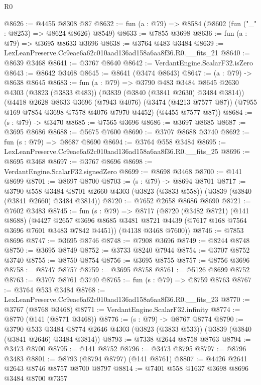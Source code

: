 \begin{lexlean}{R0}
\begin{coremodule}
@8626 := @4455 @8308 @87
@8632 := fun (a : @79) => @8584 (@8602 (fun ("_" : @8253) => @8624 @8626) @8549)
@8633 := @7855 @3698
@8636 := fun (a : @79) => @3695 @8633 @3696
@8638 := @3764 @483 @3484
@8639 := LexLeanPreserve.Cc9eae6a62c010aad136ad158a6aa8f36.R0.__fits_21
@8640 := @8639 @3468
@8641 := @3767 @8640
@8642 := VerdantEngine.ScalarF32.isZero
@8643 := @8642 @3468
@8645 := @8641 (@3474 @8643)
@8647 := (a : @79) -> @8638 @8645
@8683 := fun (a : @79) =>
  @3790
    @483
    @3484
    @8645
    @2630
    @4303
    (@3823 (@3833 @483))
    (@3839 (@3840 (@3841 @2630) @3484 @3814))
    (@4418
      @2628
      @8633
      @3696
      (@7943 @4076)
      (@3474 (@4213 @7577 @87))
      (@7955 @169 @7854 @3698 @7578 @4076 @7970 @4452)
      (@4455 @7577 @87))
@8684 := (s : @79) -> @3470
@8685 := @7565 @3696
@8686 := @3697 @8685
@8687 := @3695 @8686
@8688 := @5675 @7600
@8690 := @3707 @8688 @3740
@8692 := fun (s : @79) => @8687 @8690
@8694 := @3764 @558 @3484
@8695 := LexLeanPreserve.Cc9eae6a62c010aad136ad158a6aa8f36.R0.__fits_25
@8696 := @8695 @3468
@8697 := @3767 @8696
@8698 := VerdantEngine.ScalarF32.signedZero
@8699 := @8698 @3468
@8700 := @141 @8699
@8701 := @8697 @8700
@8703 := (s : @79) -> @8694 @8701
@8717 := @3790
    @558
    @3484
    @8701
    @2660
    @4303
    (@3823 (@3833 @558))
    (@3839 (@3840 (@3841 @2660) @3484 @3814))
@8720 := @7652 @2658 @8686 @8690
@8721 := @7602 @3483
@8745 := fun (s : @79) =>
  @8717
    (@8720
      (@3482 @8721)
      (@141 @8688)
      (@4427 @2657 @3696 @8685 @3481 @8721 @4439 (@7617 @168 @7564 @3696 @7601 @3483 @7842 @4451))
      (@4138 @3468 @7600))
@8746 := @7853 @8696
@8747 := @3695 @8746
@8748 := @7908 @3696
@8749 := @8244 @8748
@8750 := @3695 @8749
@8752 := @3733 @8240 @7944
@8754 := @3707 @8752 @3740
@8755 := @8750 @8754
@8756 := @3695 @8755
@8757 := @8756 @3696
@8758 := @8747 @8757
@8759 := @3695 @8758
@8761 := @5126 @8699 @8752
@8763 := @3707 @8761 @3740
@8765 := fun (s : @79) => @8759 @8763
@8767 := @3764 @533 @3484
@8768 := LexLeanPreserve.Cc9eae6a62c010aad136ad158a6aa8f36.R0.__fits_23
@8770 := @3767 (@8768 @3468)
@8771 := VerdantEngine.ScalarF32.infinity
@8774 := @8770 (@141 (@8771 @3468))
@8776 := (s : @79) -> @8767 @8774
@8790 := @3790
    @533
    @3484
    @8774
    @2646
    @4303
    (@3823 (@3833 @533))
    (@3839 (@3840 (@3841 @2646) @3484 @3814))
@8793 := @7338 @2644 @8758 @8763
@8794 := @3473 @8700
@8795 := @141 @8752
@8796 := @3473 @8795
@8797 := @8796 @3483
@8801 := @8793 (@8794 @8797) (@141 @8761)
@8807 := @4426 @2641 @2643 @8746 @8757 @8700 @8797
@8814 := @7401 @558 @1637 @3698 @8696 @3484 @8700 @7357

\end{coremodule}
\end{lexlean}
